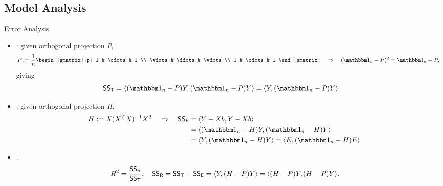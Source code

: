 \subsection{Model Analysis}

\begin{frame}{Error Analysis}

\begin{itemize}
	\justifying
	\item {}: given orthogonal projection $P$,
	\footnotesize
	\begin{align*}
	P & := \frac{1}{n}\begin{gmatrix}[p]
	1 & \cdots & 1 \\
	\vdots & \ddots & \vdots \\
	1 & \cdots & 1
	\end{gmatrix} \quad\Rightarrow\quad (\bbone_n - P)^2 = \bbone_n - P,
	\end{align*}
	\normalsize
	giving
	\footnotesize
	\begin{align*}
	\U{SS_T} & = \langle (\bbone_n - P)Y, (\bbone_n - P)Y\rangle = \langle Y, (\bbone_n - P)Y\rangle.
	\end{align*}
	\normalsize
	\item {}: given orthogonal projection $H$,
	\footnotesize
	\begin{align*}
	H := X(X^TX)^{-1}X^T \quad\Rightarrow\quad \U{SS_E} & = \langle Y-Xb, Y-Xb\rangle \\
	& = \langle(\bbone_n - H)Y, (\bbone_n - H)Y\rangle \\
	& = \langle Y, (\bbone_n - H)Y\rangle = \langle E, (\bbone_n-H)E\rangle.
	\end{align*}
	\normalsize
	\item {}:
	\footnotesize
	\begin{align*}
	R^2 = \frac{\mathsf{SS_R}}{\mathsf{SS_T}}, \quad \mathsf{SS_R} = \mathsf{SS_T} - \mathsf{SS_E} = \langle Y, (H-P)Y\rangle = \langle (H-P)Y,(H-P)Y\rangle.
	\end{align*}
\end{itemize}

\end{frame}

